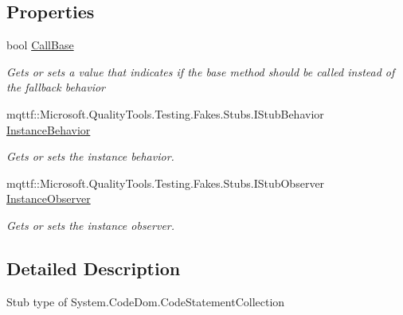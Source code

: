 \subsection*{Properties}
\begin{DoxyCompactItemize}
\item 
bool \hyperlink{class_system_1_1_code_dom_1_1_fakes_1_1_stub_code_statement_collection_ac37ad698efa6236cfd5c56b6c2441e98}{Call\-Base}
\begin{DoxyCompactList}\small\item\em Gets or sets a value that indicates if the base method should be called instead of the fallback behavior\end{DoxyCompactList}\item 
mqttf\-::\-Microsoft.\-Quality\-Tools.\-Testing.\-Fakes.\-Stubs.\-I\-Stub\-Behavior \hyperlink{class_system_1_1_code_dom_1_1_fakes_1_1_stub_code_statement_collection_ab14fb82ca1abcebc163e202a0f1d6070}{Instance\-Behavior}
\begin{DoxyCompactList}\small\item\em Gets or sets the instance behavior.\end{DoxyCompactList}\item 
mqttf\-::\-Microsoft.\-Quality\-Tools.\-Testing.\-Fakes.\-Stubs.\-I\-Stub\-Observer \hyperlink{class_system_1_1_code_dom_1_1_fakes_1_1_stub_code_statement_collection_a4b65c9d776ad9a495c9644a56c866442}{Instance\-Observer}
\begin{DoxyCompactList}\small\item\em Gets or sets the instance observer.\end{DoxyCompactList}\end{DoxyCompactItemize}


\subsection{Detailed Description}
Stub type of System.\-Code\-Dom.\-Code\-Statement\-Collection



